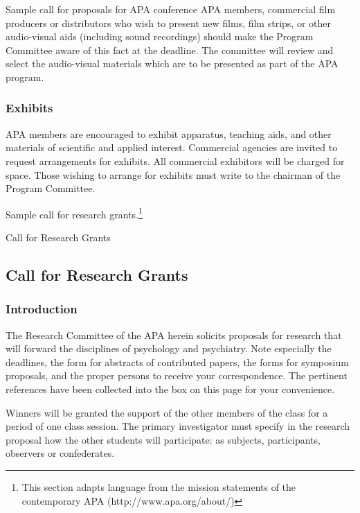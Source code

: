 \begin{refsection}
\begin{apatextbox}{Sample call for proposals for APA conference}
APA members, commercial film producers or distributors who wish to present new films, film strips, or other audio-visual aids (including sound recordings) should make the Program Committee aware of this fact at the deadline. The committee will review and select the audio-visual materials which are to be presented as part of the APA program.

\subsubsection{Exhibits}
\label{exhibits}

APA members are encouraged to exhibit apparatus, teaching aids, and other materials of scientific and applied interest. Commercial agencies are invited to request arrangements for exhibits. All commercial exhibitors will be charged for space. Those wishing to arrange for exhibits must write to the chairman of the Program Committee.
\end{apatextbox}

Sample call for research grants.\footnote{This section adapts language from the mission statements of the contemporary APA (http:\slash \slash www.apa.org\slash about\slash )}

\begin{apatextbox}{Call for Research Grants} 

\subsection{Call for Research Grants}
\label{callforresearchgrants}

\subsubsection{Introduction}
\label{introduction}

The Research Committee of the APA herein solicits proposals for research that will forward the disciplines of psychology and psychiatry. Note especially the deadlines, the form for abstracts of contributed papers, the forms for symposium proposals, and the proper persons to receive your correspondence. The pertinent references have been collected into the box on this page for your convenience.

Winners will be granted the support of the other members of the class for a period of one class session. The primary investigator must specify in the research proposal how the other students will participate: as subjects, participants, observers or confederates.


\end{apatextbox}
\end{refsection}

